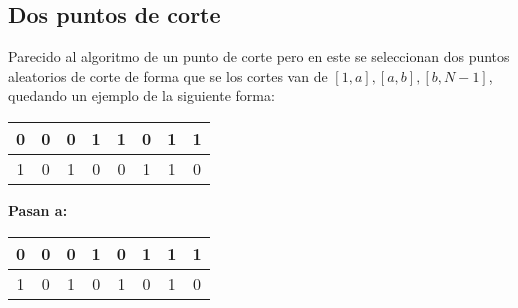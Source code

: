 \documentclass[10pt]{article}
\begin{document}
\subsection{Dos puntos de corte}
Parecido al algoritmo de un punto de corte pero en este se seleccionan dos puntos aleatorios de corte de forma que se los cortes van de $[1,a],[a,b],[b,N-1]$, quedando un ejemplo de la siguiente forma:
\begin{center}
  \begin{tabular}{|c|c|c|c|c|c|c|c|}
    \hline
    \color{green}0&\color{green}0&\color{green}0&\color{green}1&\color{blue}1&\color{blue}0&\color{green}1&\color{green}1\\
    \hline
    \color{red}1&\color{red}0&\color{red}1&\color{red}0&\color{yellow}0&\color{yellow}1&\color{red}1&\color{red}0\\
    \hline
  \end{tabular}
  \textbf{Pasan a:}
  \begin{tabular}{|c|c|c|c|c|c|c|c|}
    \hline
    \color{green}0&\color{green}0&\color{green}0&\color{green}1&\color{yellow}0&\color{yellow}1&\color{green}1&\color{green}1\\
    \hline
    \color{red}1&\color{red}0&\color{red}1&\color{red}0&\color{blue}1&\color{blue}0&\color{red}1&\color{red}0\\
    \hline
  \end{tabular}
\end{center}
\end{document}
